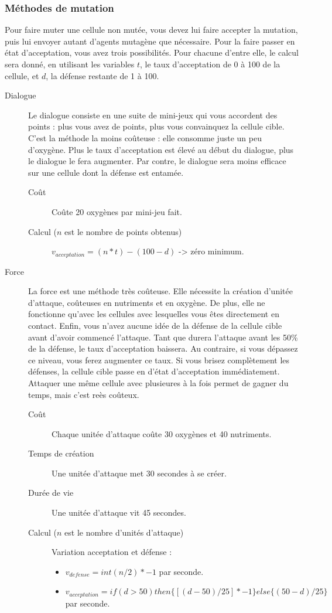 \documentclass{article}
\begin{document}
\subsubsection{Méthodes de mutation}\label{muta}
Pour faire muter une cellule non mutée, vous devez lui faire accepter la mutation, puis lui envoyer autant d'agents mutagène que nécessaire. Pour la faire passer en état d'acceptation, vous avez trois possibilités. Pour chacune d'entre elle, le calcul sera donné, en utilisant les variables $t$, le taux d'acceptation de 0 à 100 de la cellule, et $d$, la défense restante de 1 à 100.
\begin{description}
	\item[Dialogue]\label{dialogue}
		Le dialogue consiste en une suite de mini-jeux qui vous accordent des points : plus vous avez de points, plus vous convainquez la cellule cible. C'est la méthode la moins coûteuse : elle consomme juste un peu d'oxygène. Plus le taux d'acceptation est élevé au début du dialogue, plus le dialogue le fera augmenter. Par contre, le dialogue sera moins efficace sur une cellule dont la défense est entamée.\\
		\begin{description}
			\item[Coût] Coûte 20 oxygènes par mini-jeu fait.
			\item[Calcul ($n$ est le nombre de points obtenus)] $v_{acceptation} = (n*t) - (100-d)$ -> zéro minimum.
		\end{description}

	\item[Force]\label{force}
		La force est une méthode très coûteuse. Elle nécessite la création d'unitée d'attaque, coûteuses en nutriments et en oxygène. De plus, elle ne fonctionne qu'avec les cellules avec lesquelles vous êtes directement en contact. Enfin, vous n'avez aucune idée de la défense de la cellule cible avant d'avoir commencé l'attaque. Tant que durera l'attaque avant les 50\% de la défense, le taux d'acceptation baissera. Au contraire, si vous dépassez ce niveau, vous ferez augmenter ce taux. Si vous brisez complètement les défenses, la cellule cible passe en d'état d'acceptation immédiatement. Attaquer une même cellule avec plusieures à la fois permet de gagner du temps, mais c'est reès coûteux.
		\begin{description}
			\item[Coût] Chaque unitée d'attaque coûte 30 oxygènes et 40 nutriments.
			\item[Temps de création] Une unitée d'attaque met 30 secondes à se créer.
			\item[Durée de vie] Une unitée d'attaque vit 45 secondes.
			\item[Calcul ($n$ est le nombre d'unités d'attaque)] Variation acceptation et défense :\\
				\begin{itemize}
					\item $v_{defense} = int(n/2) * -1$ par seconde.
					\item $v_{acceptation} = if(d>50) then\{ [(d-50) / 25] * -1 \} else\{ (50-d) / 25\}$ par seconde.
				\end{itemize}
		\end{description}


\end{description}
\end{document}
